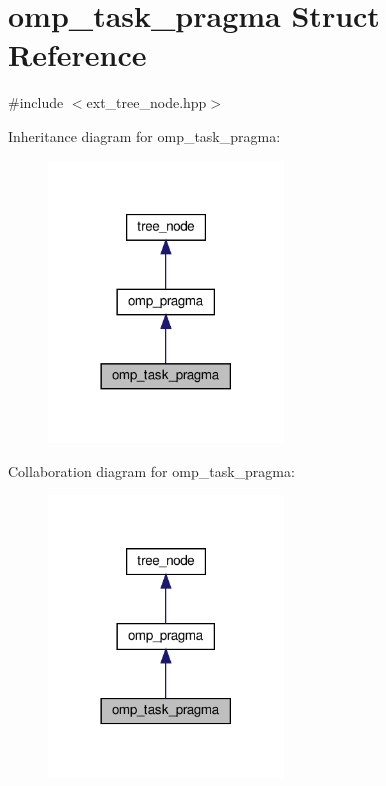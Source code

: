 \hypertarget{structomp__task__pragma}{}\section{omp\+\_\+task\+\_\+pragma Struct Reference}
\label{structomp__task__pragma}


{\ttfamily \#include $<$ext\+\_\+tree\+\_\+node.\+hpp$>$}



Inheritance diagram for omp\+\_\+task\+\_\+pragma\+:
\nopagebreak
\begin{figure}[H]
\begin{center}
\leavevmode
\includegraphics[width=177pt]{df/d09/structomp__task__pragma__inherit__graph}
\end{center}
\end{figure}


Collaboration diagram for omp\+\_\+task\+\_\+pragma\+:
\nopagebreak
\begin{figure}[H]
\begin{center}
\leavevmode
\includegraphics[width=177pt]{da/d50/structomp__task__pragma__coll__graph}
\end{center}
\end{figure}

